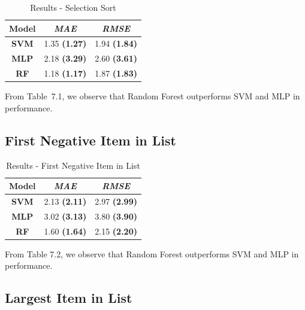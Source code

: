 \begin{table}[h]
\centering
\caption{Results - Selection Sort}
\begin{tabular}{|c|c|c|}
\hline
\textbf{Model} & \textit{\textbf{MAE}} & \textit{\textbf{RMSE}} \\ \hline
\textbf{SVM}   & 1.35 \textbf{(1.27)}           & 1.94 \textbf{(1.84)}            \\ \hline
\textbf{MLP}   & 2.18 \textbf{(3.29)}           & 2.60 \textbf{(3.61)}             \\ \hline
\textbf{RF}    & 1.18 \textbf{(1.17)}           & 1.87 \textbf{(1.83)}            \\ \hline
\end{tabular}

\label{tab:selsort}
\end{table}

From Table~7.1, we observe that Random Forest outperforms SVM and MLP in performance. 


\subsection{First Negative Item in List}

\begin{table}[h]
\centering
\caption{Results - First Negative Item in List}
\begin{tabular}{|c|c|c|}
\hline
\textbf{Model} & \textit{\textbf{MAE}} & \textit{\textbf{RMSE}} \\ \hline
\textbf{SVM}   & 2.13 \textbf{(2.11)}           & 2.97 \textbf{(2.99)}            \\ \hline
\textbf{MLP}   & 3.02 \textbf{(3.13)}           & 3.80 \textbf{(3.90)}            \\ \hline
\textbf{RF}    & 1.60 \textbf{(1.64)}           & 2.15 \textbf{(2.20)}            \\ \hline
\end{tabular}

\label{tab:first-neg}
\end{table}

From Table 7.2, we observe that Random Forest outperforms SVM and MLP in performance. 


\subsection{Largest Item in List}

